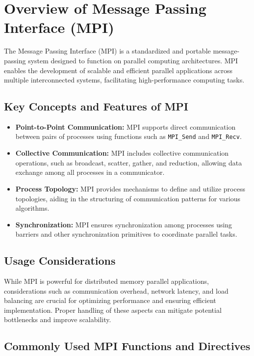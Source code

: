\section{Overview of Message Passing Interface (MPI)}

The Message Passing Interface (MPI) is a standardized and portable message-passing system designed to function on parallel computing architectures. MPI enables the development of scalable and efficient parallel applications across multiple interconnected systems, facilitating high-performance computing tasks.

\subsection{Key Concepts and Features of MPI}
\begin{itemize}
    \item \textbf{Point-to-Point Communication:} MPI supports direct communication between pairs of processes using functions such as \texttt{MPI\_Send} and \texttt{MPI\_Recv}.
    \item \textbf{Collective Communication:} MPI includes collective communication operations, such as broadcast, scatter, gather, and reduction, allowing data exchange among all processes in a communicator.
    \item \textbf{Process Topology:} MPI provides mechanisms to define and utilize process topologies, aiding in the structuring of communication patterns for various algorithms.
    \item \textbf{Synchronization:} MPI ensures synchronization among processes using barriers and other synchronization primitives to coordinate parallel tasks.
\end{itemize}

\subsection{Usage Considerations}
While MPI is powerful for distributed memory parallel applications, considerations such as communication overhead, network latency, and load balancing are crucial for optimizing performance and ensuring efficient implementation. Proper handling of these aspects can mitigate potential bottlenecks and improve scalability.

\subsection{Commonly Used MPI Functions and Directives}

